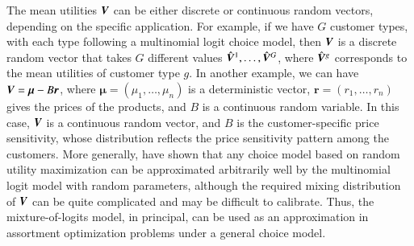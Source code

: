 The mean utilities ${\bm V}$ can be either discrete or continuous random vectors, depending on the specific application. For example, if we have $G$ customer types, with each type following a multinomial logit choice model, then ${\bm V}$ is a discrete random vector that takes $G$ different values $\hat{{\bm V}}^1,\ldots,\hat{{\bm V}}^G$, where $\hat{{\bm V}}^g$ corresponds to the mean utilities of customer type $g$.  In another example, we can have  ${\bm V} = \bm{\mu} - B \bm{r}$, where $\bm{\mu}= (\mu_1, \ldots, \mu_n)$ is a deterministic vector, $\bm{r} = (r_1, \ldots, r_n)$ gives the prices of the products, and $B$ is a continuous random variable.  In this case, ${\bm V}$ is a continuous random vector, and $B$ is the customer-specific price sensitivity, whose distribution reflects the price sensitivity pattern among the customers.   More generally,
\cite{McTr00} have shown that any choice model based on random utility maximization can be approximated arbitrarily well by the multinomial logit model with random parameters, although the required mixing distribution of ${\bm V}$ can be quite complicated and may be difficult to calibrate.  Thus, the mixture-of-logits model, in principal, can be used as an approximation  in assortment optimization problems under a general choice model.







